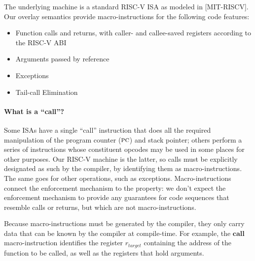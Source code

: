 \documentclass[10pt,conference]{ieeetran}%
\theoremstyle{definition}
\begin{document}
The underlying machine is a standard RISC-V ISA as modeled in [MIT-RISCV].
Our overlay semantics provide macro-instructions for the following code features:
\begin{itemize}
\item Function calls and returns, with caller- and callee-saved registers according
  to the RISC-V ABI
\item Arguments passed by reference
\item Exceptions
\item Tail-call Elimination
\end{itemize}

\paragraph*{What is a ``call''?} Some ISAs have a single ``call''
instruction that does all the required manipulation of the program counter
(\(\textsc{pc}\)) and stack pointer; others perform a series of instructions
whose constituent opcodes may be used in some places for other purposes.
Our RISC-V machine is the latter, so calls must be explicitly designated
as such by the compiler, by identifying them as macro-instructions.
The same goes for other operations, such as exceptions.
Macro-instructions connect the enforcement mechanism to the property: we don't
expect the enforcement mechanism to provide any guarantees for code sequences
that resemble calls or returns, but which are not macro-instructions.

Because macro-instructions must be generated by the compiler, they only
carry data that can be known by the compiler at compile-time. For example,
the \(\mathbf{call}\) macro-instruction identifies the register \(r_{target}\) containing
the address of the function to be called, as well as the registers that hold arguments.


\end{document}

